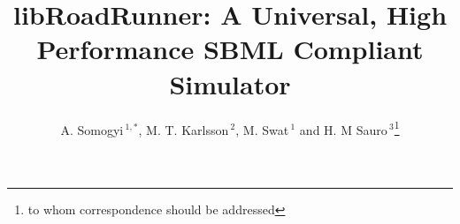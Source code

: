 \documentclass{bioinfo}
\begin{document}

\title[libRoadRunner]{libRoadRunner: A Universal, High Performance SBML Compliant Simulator}
\author[Sample \textit{et~al}]{A. Somogyi\,$^{1,*}$, M. T. Karlsson\,$^{2}$, M. Swat\,$^{1}$ and H. M Sauro\,$^3$\footnote{to whom correspondence should be addressed}}
\address{$^{1,3}$Biocomplexity Institute, Indiana University, Simon Hall MSB1, 212 S. Hawthorne Drive, Bloomington, IN  47405-7003
\\
$^{2}$Dune Scientific, 10522 Lake City Way NE, \#302 Seattle WA \\
$^{3}$Department of Bioengineering, University of Washington, Seattle, WA, 98195}



\maketitle
\end{document}
